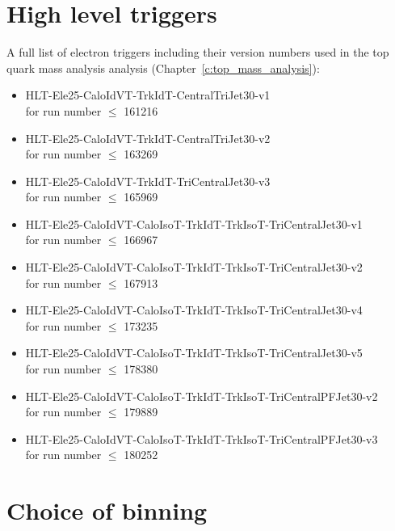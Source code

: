 
\chapter{High level triggers}
\label{a:full_trigger_list}
 
A full list of electron triggers including their version numbers used in the top quark mass analysis analysis
(Chapter~\ref{c:top_mass_analysis}):
\begin{itemize}
 \item HLT-Ele25-CaloIdVT-TrkIdT-CentralTriJet30-v1 \\for run number $\leq$ 161216
 \item HLT-Ele25-CaloIdVT-TrkIdT-CentralTriJet30-v2 \\for run number $\leq$ 163269
 \item HLT-Ele25-CaloIdVT-TrkIdT-TriCentralJet30-v3 \\for run number $\leq$ 165969
 \item HLT-Ele25-CaloIdVT-CaloIsoT-TrkIdT-TrkIsoT-TriCentralJet30-v1 \\for run number $\leq$ 166967
 \item HLT-Ele25-CaloIdVT-CaloIsoT-TrkIdT-TrkIsoT-TriCentralJet30-v2 \\for run number $\leq$ 167913
 \item HLT-Ele25-CaloIdVT-CaloIsoT-TrkIdT-TrkIsoT-TriCentralJet30-v4 \\for run number $\leq$ 173235
 \item HLT-Ele25-CaloIdVT-CaloIsoT-TrkIdT-TrkIsoT-TriCentralJet30-v5 \\for run number $\leq$ 178380
 \item \small{HLT-Ele25-CaloIdVT-CaloIsoT-TrkIdT-TrkIsoT-TriCentralPFJet30-v2 \\for run number $\leq$ 179889}
 \item HLT-Ele25-CaloIdVT-CaloIsoT-TrkIdT-TrkIsoT-TriCentralPFJet30-v3 \\for run number $\leq$ 180252
\end{itemize}

\ifpdf
    \graphicspath{{06_Cross_section_analysis/plots/}}
\else
    \graphicspath{{06_Cross_section_analysis/plots/EPS/}{06_Cross_section_analysis/plots/}}
\fi

\chapter{Choice of binning}
\label{a:binning}

